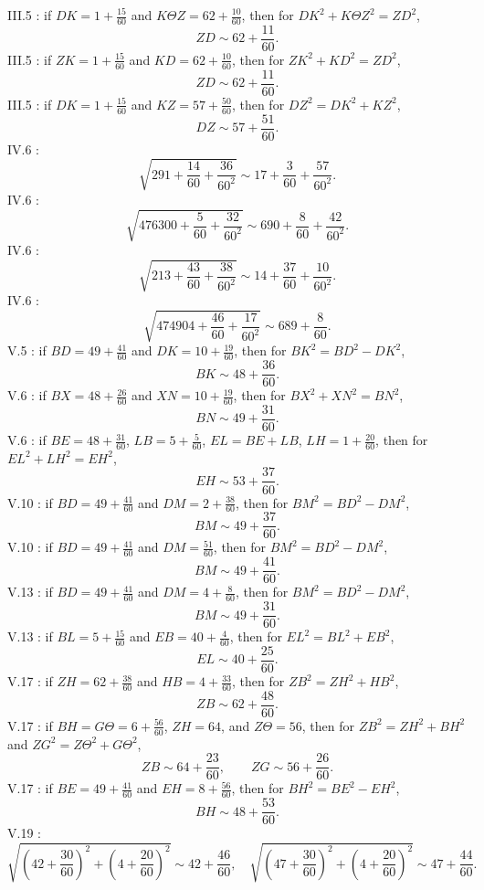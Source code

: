 \documentclass{article}
\theoremstyle{definition}
\begin{document}
 
III.5 \cite[p.~158]{almagest}: if $DK=1+\frac{15}{60}$ and $K\Theta Z=62+\frac{10}{60}$, then for
$DK^2+K\Theta Z^2=ZD^2$,
\[
ZD \sim 62+\frac{11}{60}.
\]
III.5 \cite[p.~160]{almagest}: if $ZK=1+\frac{15}{60}$ and $KD=62+\frac{10}{60}$,
then for $ZK^2+KD^2=ZD^2$,
\[
ZD \sim 62+\frac{11}{60}.
\]
III.5 \cite[p.~162]{almagest}: if $DK=1+\frac{15}{60}$ and $KZ=57+\frac{50}{60}$, then for
$DZ^2=DK^2+KZ^2$,
\[
DZ \sim 57+\frac{51}{60}.
\]
IV.6 \cite[pp.~195--196]{almagest}:
\[
\sqrt{291+\frac{14}{60}+\frac{36}{60^2}} \sim 17 + \frac{3}{60}+\frac{57}{60^2}. 
\]
IV.6 \cite[p.~197]{almagest}:
\[
\sqrt{476300+\frac{5}{60}+\frac{32}{60^2}} \sim 690+\frac{8}{60}+\frac{42}{60^2}.
\]
IV.6 \cite[p.~201]{almagest}:
\[
\sqrt{213+\frac{43}{60}+\frac{38}{60^2}} \sim  14+\frac{37}{60}+\frac{10}{60^2}.
\]
IV.6 \cite[pp.~201--202]{almagest}:
\[
\sqrt{474904+\frac{46}{60}+\frac{17}{60^2}} \sim 689+\frac{8}{60}.
\]
V.5 \cite[p.~231]{almagest}: if $BD=49+\frac{41}{60}$ and $DK = 10+\frac{19}{60}$, then for
$BK^2=BD^2-DK^2$,
\[
BK \sim 48 + \frac{36}{60}.
\]
V.6 \cite[p.~234]{almagest}: if $BX=48+\frac{26}{60}$ and $XN=10+\frac{19}{60}$, then for
$BX^2+XN^2=BN^2$,
\[
BN \sim 49+ \frac{31}{60}.
\]
V.6 \cite[p.~234]{almagest}: if $BE=48+\frac{31}{60}$, $LB=5+\frac{5}{60}$, $EL=BE+LB$,
$LH=1+\frac{20}{60}$, then for $EL^2+LH^2=EH^2$,
\[
EH \sim 53+\frac{37}{60}.
\]
V.10 \cite[p.~241]{almagest}: if $BD=49+\frac{41}{60}$ and $DM=2+\frac{38}{60}$, then  for
$BM^2=BD^2-DM^2$,
\[
BM \sim 49+ \frac{37}{60}.
\]
V.10 \cite[p.~242]{almagest}: if $BD=49+\frac{41}{60}$ and $DM=\frac{51}{60}$, then for
$BM^2=BD^2-DM^2$,
\[
BM \sim 49+\frac{41}{60}.
\]
V.13 \cite[p.~250]{almagest}: if $BD=49+\frac{41}{60}$ and $DM=4+\frac{8}{60}$, then for $BM^2=BD^2-DM^2$,
\[
BM \sim 49+\frac{31}{60}.
\]
V.13 \cite[p.~251]{almagest}: if $BL=5+\frac{15}{60}$ and $EB=40+\frac{4}{60}$, then for $EL^2=BL^2+EB^2$,
\[
EL \sim 40+\frac{25}{60}.
\]
V.17 \cite[p.~261]{almagest}: if $ZH=62+\frac{38}{60}$ and $HB=4+\frac{33}{60}$, then for
$ZB^2=ZH^2+HB^2$,
\[
ZB \sim 62+\frac{48}{60}.
\]
V.17 \cite[p.~262]{almagest}: if $BH=G\Theta=6+\frac{56}{60}$, $ZH=64$, and $Z\Theta=56$, then for
$ZB^2=ZH^2+BH^2$ and $ZG^2=Z\Theta^2+G\Theta^2$,
\[
ZB \sim 64+\frac{23}{60}, \qquad ZG \sim 56+\frac{26}{60}.
\]
V.17 \cite[p.~263]{almagest}: if $BE=49+\frac{41}{60}$ and $EH=8+\frac{56}{60}$, then for $BH^2=BE^2-EH^2$,
\[
BH \sim 48+\frac{53}{60}.
\]
V.19 \cite[p.~273]{almagest}:
\[
\sqrt{\left(42+\frac{30}{60}\right)^2 + \left(4+\frac{20}{60} \right)^2} \sim 42+\frac{46}{60},
\quad
\sqrt{\left(47+\frac{30}{60}\right)^2 + \left(4+\frac{20}{60} \right)^2} \sim 47+\frac{44}{60}.
\]
\end{document}
